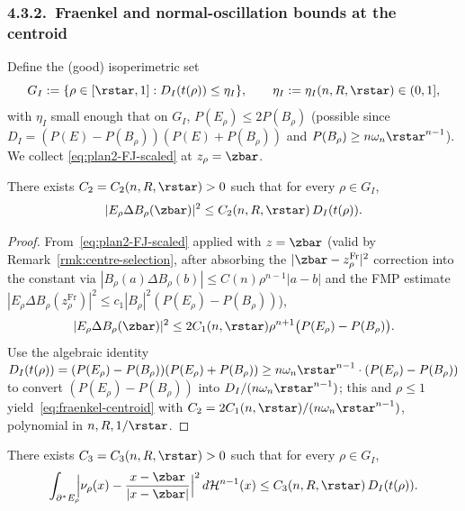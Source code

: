 \subsubsection{4.3.2.\ Fraenkel and normal-oscillation bounds at the centroid}
\label{ssec:fj-bounds}

Define the (good) isoperimetric set
\begin{equation}\label{eq:GI-def}
   G_I:=\{\rho\in[\rstar,1]:D_I(t(\rho))\le\eta_I\},\qquad
   \eta_I:=\eta_I(n,R,\rstar)\in(0,1],
\end{equation}
with $\eta_I$ small enough that on $G_I$, $P(E_\rho)\le 2P(B_\rho)$
(possible since $D_I=(P(E)-P(B_\rho))(P(E)+P(B_\rho))$ and
$P(B_\rho)\ge n\omega_n\rstar^{n-1}$). We collect
\eqref{eq:plan2-FJ-scaled} at $z_\rho=\zbar$.

\begin{lemma}\label{lem:fraenkel-centroid}
There exists $C_2=C_2(n,R,\rstar)>0$ such that for every $\rho\in G_I$,
\begin{equation}\label{eq:fraenkel-centroid}
   |E_\rho\Delta B_\rho(\zbar)|^2
   \le C_2(n,R,\rstar)\,D_I(t(\rho)).
\end{equation}
\end{lemma}

\begin{proof}
From~\eqref{eq:plan2-FJ-scaled} applied with $z=\zbar$ (valid by
Remark~\ref{rmk:centre-selection}, after absorbing the
$|\zbar-z^{\mathrm{Fr}}_\rho|^2$ correction into the constant via
$|B_\rho(a)\Delta B_\rho(b)|\le C(n)\rho^{n-1}|a-b|$ and the FMP estimate
$|E_\rho\Delta B_\rho(z^{\mathrm{Fr}}_\rho)|^2\le c_1|B_\rho|^2(P(E_\rho)-P(B_\rho))$),
\begin{equation}\label{eq:fraenkel-centroid-pre}
   |E_\rho\Delta B_\rho(\zbar)|^2
   \le 2C_1(n,\rstar)\rho^{n+1}\bigl(P(E_\rho)-P(B_\rho)\bigr).
\end{equation}
Use the algebraic identity
$D_I(t(\rho))=(P(E_\rho)-P(B_\rho))(P(E_\rho)+P(B_\rho))\ge n\omega_n\rstar^{n-1}\cdot(P(E_\rho)-P(B_\rho))$
to convert $(P(E_\rho)-P(B_\rho))$ into $D_I/(n\omega_n\rstar^{n-1})$;
this and $\rho\le1$ yield~\eqref{eq:fraenkel-centroid} with
$C_2=2C_1(n,\rstar)/(n\omega_n\rstar^{n-1})$, polynomial in $n,R,1/\rstar$.
\end{proof}

\begin{lemma}
\label{lem:normal-osc-centroid}
There exists $C_3=C_3(n,R,\rstar)>0$ such that for every $\rho\in G_I$,
\begin{equation}\label{eq:normal-osc-centroid}
   \int_{\partial^*E_\rho}\!\!\Bigl|\nu_\rho(x)-\frac{x-\zbar}{|x-\zbar|}\Bigr|^2\,
      d\mathcal H^{n-1}(x)
   \le C_3(n,R,\rstar)\,D_I(t(\rho)).
\end{equation}
\end{lemma}

